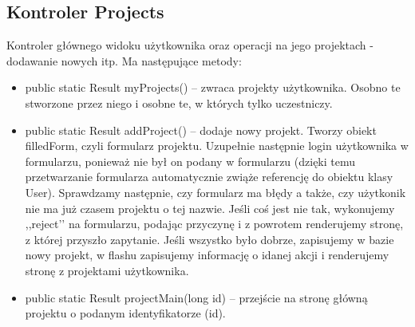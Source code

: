 \documentclass[a4paper,12pt,notitlepage]{mwrep}
\begin{document}
\subsection{Kontroler Projects}
Kontroler głównego widoku użytkownika oraz operacji na jego projektach - dodawanie nowych
itp. Ma następujące metody:
\begin{itemize}
    \item    public static Result myProjects() -- zwraca projekty użytkownika. Osobno te
        stworzone przez niego i osobne te, w których tylko uczestniczy.
    \item    public static Result addProject() -- dodaje nowy projekt. Tworzy obiekt
        filledForm, czyli formularz projektu. Uzupełnie następnie login użytkownika
        w formularzu, ponieważ nie był on podany w formularzu (dzięki temu
        przetwarzanie formularza automatycznie zwiąże referencję do obiektu
        klasy User). Sprawdzamy następnie, czy formularz ma błędy a także, czy
        użytkonik nie ma już czasem projektu o tej nazwie. Jeśli coś jest nie tak,
        wykonujemy ,,reject’’ na formularzu, podając przyczynę i z powrotem
        renderujemy stronę, z której przyszło zapytanie. Jeśli wszystko było dobrze,
        zapisujemy w bazie nowy projekt, w flashu zapisujemy informację o idanej akcji
        i renderujemy stronę z projektami użytkownika.
    \item    public static Result projectMain(long id) -- przejście na stronę główną projektu
        o podanym identyfikatorze (id).
\end{itemize}
\end{document}
